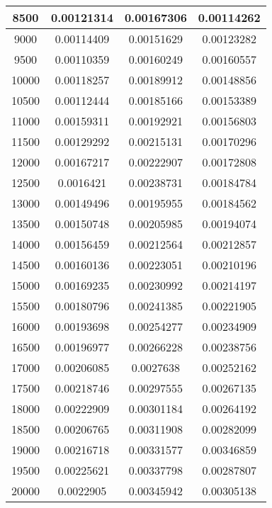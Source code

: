 \documentclass{article}
\begin{document}
\begin{longtable}{|c|c|c|c|}
		    8500   &  0.00121314    & 	0.00167306	 &  0.00114262  \\ \hline
		    9000   &  0.00114409    & 	0.00151629	 &  0.00123282  \\ \hline
		    9500   &  0.00110359    & 	0.00160249	 &  0.00160557  \\ \hline
		    10000  &  0.00118257    & 	0.00189912	 &  0.00148856  \\ \hline
		    10500  &  0.00112444    & 	0.00185166	 &  0.00153389  \\ \hline
		    11000  &  0.00159311    & 	0.00192921	 &  0.00156803  \\ \hline
		    11500  &  0.00129292    & 	0.00215131	 &  0.00170296  \\ \hline
		    12000  &  0.00167217    & 	0.00222907	 &  0.00172808  \\ \hline
		    12500  &  0.0016421	    &   0.00238731	 &  0.00184784  \\ \hline
		    13000  &  0.00149496    & 	0.00195955	 &  0.00184562  \\ \hline
		    13500  &  0.00150748    & 	0.00205985	 &  0.00194074  \\ \hline
		    14000  &  0.00156459    & 	0.00212564	 &  0.00212857  \\ \hline
		    14500  &  0.00160136    & 	0.00223051	 &  0.00210196  \\ \hline
		    15000  &  0.00169235    & 	0.00230992	 &  0.00214197  \\ \hline
		    15500  &  0.00180796    & 	0.00241385	 &  0.00221905  \\ \hline
		    16000  &  0.00193698    & 	0.00254277	 &  0.00234909  \\ \hline
		    16500  &  0.00196977    & 	0.00266228	 &  0.00238756  \\ \hline
		    17000  &  0.00206085    & 	0.0027638	 &  0.00252162  \\ \hline
		    17500  &  0.00218746    & 	0.00297555	 &  0.00267135  \\ \hline
		    18000  &  0.00222909    & 	0.00301184	 &  0.00264192  \\ \hline
		    18500  &  0.00206765    & 	0.00311908	 &  0.00282099  \\ \hline
		    19000  &  0.00216718    & 	0.00331577	 &  0.00346859  \\ \hline
		    19500  &  0.00225621    & 	0.00337798	 &  0.00287807  \\ \hline
		    20000  &  0.0022905	    &   0.00345942	 &  0.00305138  \\ \hline

\end{longtable}
\end{document}
